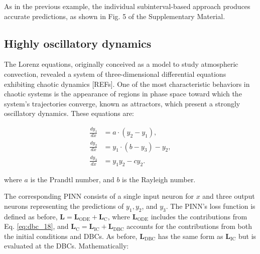 As in the previous example, the individual subinterval-based approach produces accurate predictions, as shown in Fig. 5 of the Supplementary Material.


\subsection{Highly oscillatory dynamics}\label{sec:dbc_lorenz}

The Lorenz equations, originally conceived as a model to study atmospheric convection, revealed a system of three-dimensional differential equations exhibiting chaotic dynamics [REFs]. One of the most characteristic behaviors in chaotic systems is the appearance of regions in phase space toward which the system's trajectories converge, known as attractors, which present a strongly oscillatory dynamics. These equations are:

\begin{equation}\label{eq:dbc_18}
\begin{aligned}\frac{dy_1}{dx}&=a\cdot(y_2-y_1),\\\frac{dy_2}{dx}&=y_1\cdot(b-y_3)-y_2,\\\frac{dy_3}{dx}&=y_1y_2-cy_2.\end{aligned}
\end{equation}

where $a$ is the Prandtl number, and $b$ is the Rayleigh number.

The corresponding PINN consists of a single input neuron for $x$ and three output neurons representing the predictions of $y_1 , y_2$, and $y_3$. The PINN's loss function is defined as before, $\mathbf{L} = \mathbf{L}_{\mathrm{ODE}} + \mathbf{L}_{\mathrm{C}}$, where $\mathbf{L}_{\mathrm{ODE}}$ includes the contributions from Eq. \ref{eq:dbc_18}, and $\mathbf{L}_{\mathrm{C}} = \mathbf{L}_{\mathrm{IC}} + \mathbf{L}_{\mathrm{DBC}}$ accounts for the contributions from both the initial conditions and DBCs. As before, $\mathbf{L}_{\mathrm{DBC}}$ has the same form as $\mathbf{L}_{\mathrm{IC}}$ but is evaluated at the DBCs. Mathematically:

